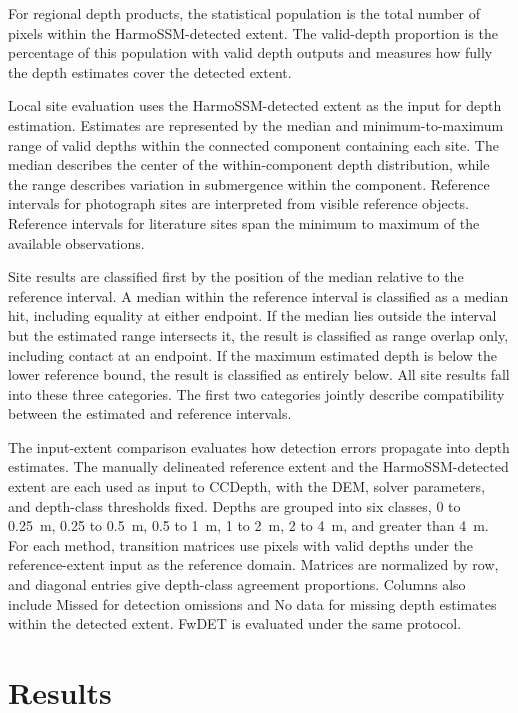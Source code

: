 \documentclass[authoryear,preprint,12pt]{elsarticle}
\begin{document}
For regional depth products, the statistical population is the total number of pixels within the HarmoSSM-detected extent. The valid-depth proportion is the percentage of this population with valid depth outputs and measures how fully the depth estimates cover the detected extent.

Local site evaluation uses the HarmoSSM-detected extent as the input for depth estimation. Estimates are represented by the median and minimum-to-maximum range of valid depths within the connected component containing each site. The median describes the center of the within-component depth distribution, while the range describes variation in submergence within the component. Reference intervals for photograph sites are interpreted from visible reference objects. Reference intervals for literature sites span the minimum to maximum of the available observations.

Site results are classified first by the position of the median relative to the reference interval. A median within the reference interval is classified as a median hit, including equality at either endpoint. If the median lies outside the interval but the estimated range intersects it, the result is classified as range overlap only, including contact at an endpoint. If the maximum estimated depth is below the lower reference bound, the result is classified as entirely below. All site results fall into these three categories. The first two categories jointly describe compatibility between the estimated and reference intervals.

The input-extent comparison evaluates how detection errors propagate into depth estimates. The manually delineated reference extent and the HarmoSSM-detected extent are each used as input to CCDepth, with the DEM, solver parameters, and depth-class thresholds fixed. Depths are grouped into six classes, 0 to 0.25~m, 0.25 to 0.5~m, 0.5 to 1~m, 1 to 2~m, 2 to 4~m, and greater than 4~m. For each method, transition matrices use pixels with valid depths under the reference-extent input as the reference domain. Matrices are normalized by row, and diagonal entries give depth-class agreement proportions. Columns also include Missed for detection omissions and No data for missing depth estimates within the detected extent. FwDET is evaluated under the same protocol.

\FloatBarrier
\endgroup

\section{Results}
\end{document}
